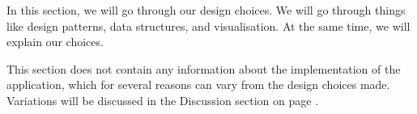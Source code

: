 In this section, we will go through our design choices. We will go through things like design patterns, data structures, and visualisation. At the same time, we will explain our choices.

This section does not contain any information about the implementation of the application, which for several reasons can vary from the design choices made. Variations will be discussed in the Discussion section on page \pageref{sec:Discussion}.